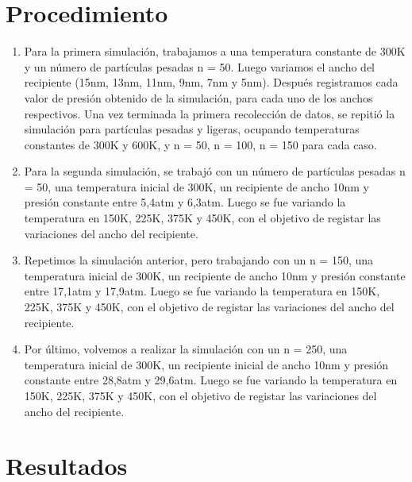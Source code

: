 \documentclass[]{article}
\begin{document}
\section{Procedimiento}
\begin{enumerate}
    \item Para la primera simulación, trabajamos a una temperatura constante de 300K y un número de partículas pesadas n = 50. Luego variamos el ancho del recipiente (15nm, 13nm, 11nm,
    9nm, 7nm y 5nm). Después registramos cada valor de presión obtenido de la simulación, para cada
    uno de los anchos respectivos.
    Una vez terminada la primera recolección de datos, se repitió la simulación para partículas pesadas y ligeras, ocupando temperaturas constantes de 300K y 600K, y n = 50, n = 100, n = 150
    para cada caso. 

    \item Para la segunda simulación, se trabajó con un número de partículas pesadas n = 50, una
    temperatura inicial de 300K, un recipiente de ancho 10nm  y presión constante entre 5,4atm y 6,3atm.
    Luego se fue variando la temperatura en 150K, 225K, 375K y 450K, con el objetivo de registar las variaciones del ancho del recipiente.
    

    \item   Repetimos la simulación anterior, pero trabajando con un n = 150,  una temperatura inicial de 300K,  un recipiente de ancho 10nm y presión constante entre 17,1atm y 17,9atm. 
    Luego se fue variando la temperatura en 150K, 225K, 375K y 450K, con el objetivo de registar las variaciones del ancho del recipiente. 
    
    \item  Por último, volvemos a realizar la simulación con un n = 250, una temperatura inicial de 300K, un
    recipiente inicial de ancho 10nm y presión constante entre 28,8atm y 29,6atm.
    Luego se fue variando la temperatura en 150K, 225K, 375K y 450K, con el objetivo de registar las variaciones del ancho del recipiente.
   
    
    
\end{enumerate}









\section{Resultados}
\end{document}
